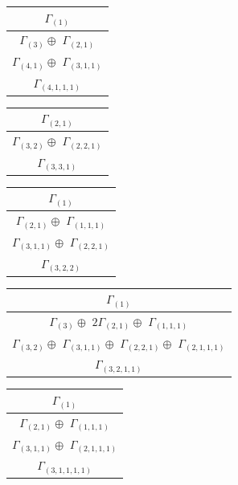 \documentclass[main.tex]{subfiles}
\begin{document}
\begin{minipage}{.2\textwidth}
\centering
\begin{tabular}{c}
$\Gamma_{(
1
)}$
\\ \hline
$\Gamma_{(
3
)} \oplus$
$\Gamma_{(
2 , 
1
)}$
\\ \hline
$\Gamma_{(
4 , 
1
)} \oplus$
$\Gamma_{(
3 , 
1 , 
1
)}$
\\ \hline
$\Gamma_{(
4 , 
1 , 
1 , 
1
)}$
\\
\end{tabular}\end{minipage}
\begin{minipage}{.3\textwidth}
\centering
\begin{tabular}{c}
$\Gamma_{(
2 , 
1
)}$
\\ \hline
$\Gamma_{(
3 , 
2
)} \oplus$
$\Gamma_{(
2 , 
2 , 
1
)}$
\\ \hline
$\Gamma_{(
3 , 
3 , 
1
)}$
\\
\end{tabular}\end{minipage}
\begin{minipage}{.3\textwidth}
\centering
\begin{tabular}{c}
$\Gamma_{(
1
)}$
\\ \hline
$\Gamma_{(
2 , 
1
)} \oplus$
$\Gamma_{(
1 , 
1 , 
1
)}$
\\ \hline
$\Gamma_{(
3 , 
1 , 
1
)} \oplus$
$\Gamma_{(
2 , 
2 , 
1
)}$
\\ \hline
$\Gamma_{(
3 , 
2 , 
2
)}$
\\
\end{tabular}\end{minipage}
\bigskip
\begin{minipage}{.4\textwidth}
\centering
\begin{tabular}{c}
$\Gamma_{(
1
)}$
\\ \hline
$\Gamma_{(
3
)} \oplus$
$2\Gamma_{(
2 , 
1
)} \oplus$
$\Gamma_{(
1 , 
1 , 
1
)}$
\\ \hline
$\Gamma_{(
3 , 
2
)} \oplus$
$\Gamma_{(
3 , 
1 , 
1
)} \oplus$
$\Gamma_{(
2 , 
2 , 
1
)} \oplus$
$\Gamma_{(
2 , 
1 , 
1 , 
1
)}$
\\ \hline
$\Gamma_{(
3 , 
2 , 
1 , 
1
)}$
\\
\end{tabular}\end{minipage}
\begin{minipage}{.3\textwidth}
\centering
\begin{tabular}{c}
$\Gamma_{(
1
)}$
\\ \hline
$\Gamma_{(
2 , 
1
)} \oplus$
$\Gamma_{(
1 , 
1 , 
1
)}$
\\ \hline
$\Gamma_{(
3 , 
1 , 
1
)} \oplus$
$\Gamma_{(
2 , 
1 , 
1 , 
1
)}$
\\ \hline
$\Gamma_{(
3 , 
1 , 
1 , 
1 , 
1
)}$
\\
\end{tabular}\end{minipage}
\end{document}

